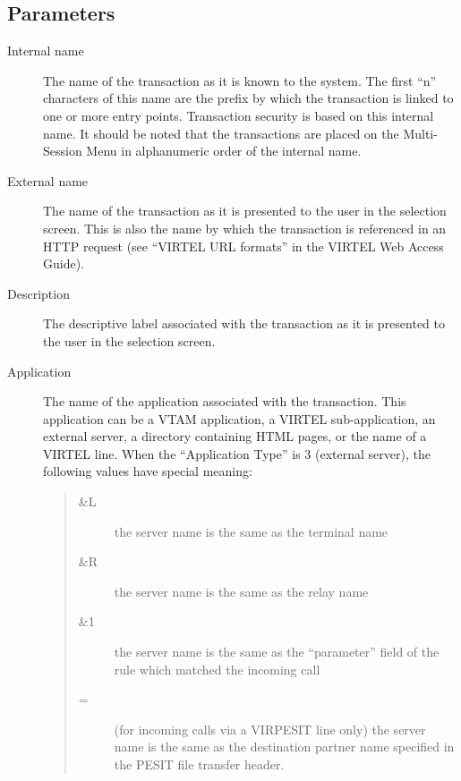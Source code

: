 \documentclass[letterpaper,10pt,english]{sphinxmanual}
\begin{document}
\subsection{Parameters}
\label{\detokenize{connectivity_guide:index-115}}\label{\detokenize{connectivity_guide:id65}}\begin{description}
\item[{Internal name}] \leavevmode
The name of the transaction as it is known to the system. The first “n” characters of this name are the prefix by which the transaction is linked to one or more entry points. Transaction security is based on this internal name. It should be noted that the transactions are placed on the Multi-Session Menu in alphanumeric order of the internal name.

\item[{External name}] \leavevmode
The name of the transaction as it is presented to the user in the selection screen. This is also the name by which the transaction is referenced in an HTTP request (see “VIRTEL URL formats” in the VIRTEL Web Access Guide).

\item[{Description}] \leavevmode
The descriptive label associated with the transaction as it is presented to the user in the selection screen.

\item[{Application}] \leavevmode
The name of the application associated with the transaction. This application can be a VTAM application, a VIRTEL sub-application, an external server, a directory containing HTML pages, or the name of a VIRTEL line. When the “Application Type” is 3 (external server), the following values have special meaning:
\begin{quote}
\begin{description}
\item[{\&L}] \leavevmode
the server name is the same as the terminal name

\item[{\&R}] \leavevmode
the server name is the same as the relay name

\item[{\&1}] \leavevmode
the server name is the same as the “parameter” field of the rule which matched the incoming call

\item[{=}] \leavevmode
(for incoming calls via a VIRPESIT line only) the server name is the same as the destination partner name specified in the PESIT file transfer header.


\end{description}
\end{quote}
\end{description}
\end{document}
